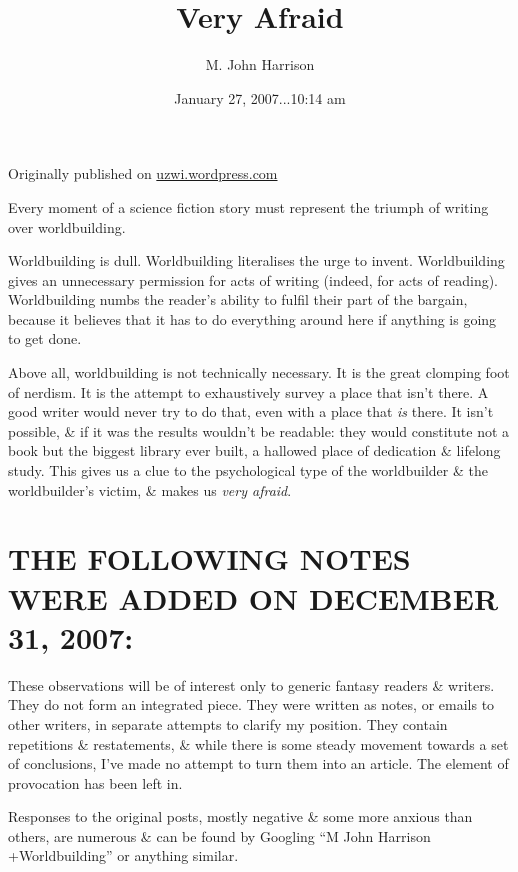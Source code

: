 \documentclass[14pt]{extarticle}
\title{\Huge Very Afraid}
\author{\Large M. John Harrison}
\date{\large January 27, 2007...10:14 am}
\begin{document}
\maketitle

\vspace{-2em}
\begin{center}
  \normalsize Originally published on 
  \href{https://web.archive.org/web/20080410181840/http://uzwi.wordpress.com/2007/01/27/very-afraid/}{uzwi.wordpress.com}
\end{center}

Every moment of a science fiction story must represent the triumph of writing over worldbuilding.



Worldbuilding is dull. Worldbuilding literalises the urge to invent. Worldbuilding gives an unnecessary permission for acts of writing (indeed, for acts of reading). Worldbuilding numbs the reader’s ability to fulfil their part of the bargain, because it believes that it has to do everything around here if anything is going to get done.

Above all, worldbuilding is not technically necessary. It is the great clomping foot of nerdism. It is the attempt to exhaustively survey a place that isn’t there. A good writer would never try to do that, even with a place that \emph{is} there. It isn’t possible, \& if it was the results wouldn’t be readable: they would constitute not a book but the biggest library ever built, a hallowed place of dedication \& lifelong study. This gives us a clue to the psychological type of the worldbuilder \& the worldbuilder’s victim, \& makes us \emph{very afraid}.

\section*{THE FOLLOWING NOTES WERE ADDED ON DECEMBER 31, 2007:}

These observations will be of interest only to generic fantasy readers \& writers. They do not form an integrated piece. They were written as notes, or emails to other writers, in separate attempts to clarify my position. They contain repetitions \& restatements, \& while there is some steady movement towards a set of conclusions, I’ve made no attempt to turn them into an article. The element of provocation has been left in.

Responses to the original posts, mostly negative \& some more anxious than others, are numerous \& can be found by Googling “M John Harrison +Worldbuilding” or anything similar.
\end{document}

